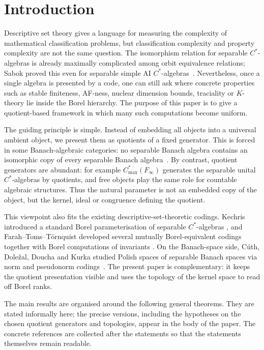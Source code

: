 \documentclass[12pt,fleqn,a4paper]{amsart}
\numberwithin{equation}{section}
\theoremstyle{definition}
\begin{document}
\section{Introduction}

Descriptive set theory gives a language for measuring the complexity of mathematical
classification problems, but classification complexity and property complexity are not
the same question.  The isomorphism relation for separable $C^*$-algebras is already
maximally complicated among orbit equivalence relations; Sabok proved this even for
separable simple AI $C^*$-algebras~\cite{SabokCompleteness}.  Nevertheless, once a
single algebra is presented by a code, one can still ask where concrete properties such
as stable finiteness, AF-ness, nuclear dimension bounds, traciality or $K$-theory lie
inside the Borel hierarchy.  The purpose of this paper is to give a quotient-based
framework in which many such computations become uniform.

The guiding principle is simple.  Instead of embedding all objects into a universal
ambient object, we present them as quotients of a fixed generator.  This is forced in
some Banach-algebraic categories: no separable Banach algebra contains an isomorphic
copy of every separable Banach algebra~\cite{KaniaNoUniversalBanachAlg}.  By contrast,
quotient generators are abundant: for example $C^*_{\max}(F_\infty)$ generates the
separable unital $C^*$-algebras by quotients, and free objects play the same role for
countable algebraic structures.  Thus the natural parameter is not an embedded copy of
the object, but the kernel, ideal or congruence defining the quotient.

This viewpoint also fits the existing descriptive-set-theoretic codings.  Kechris
introduced a standard Borel parameterisation of separable $C^*$-algebras
\cite{KechrisAsianCstar}, and Farah--Toms--T\"ornquist developed several mutually
Borel-equivalent codings together with Borel computations of invariants
\cite{FarahTomsTornquist,FarahTomsTornquistCrelle}.  On the Banach-space side,
C\'uth, Dole\v{z}al, Doucha and Kurka studied Polish spaces of separable Banach
spaces via norm and pseudonorm codings~\cite{CuthDolezalDouchaKurka2022,CuthDolezalDouchaKurka2024}.
The present paper is complementary: it keeps the quotient presentation visible and uses
the topology of the kernel space to read off Borel ranks.

The main results are organised around the following general theorems.  They are stated
informally here; the precise versions, including the hypotheses on the chosen quotient
generators and topologies, appear in the body of the paper.  The concrete references
are collected after the statements so that the statements themselves remain readable.
\end{document}
